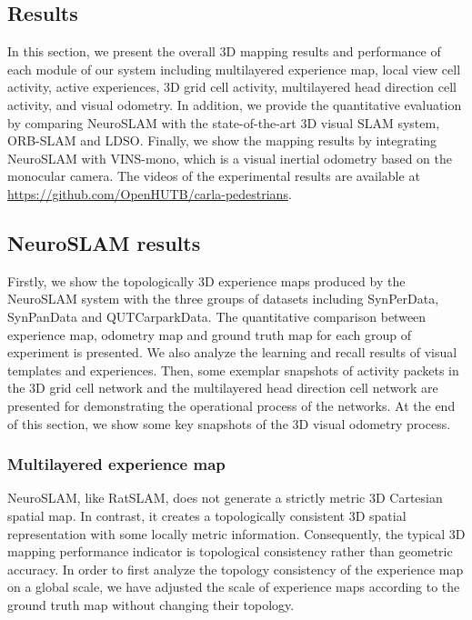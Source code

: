 \subsection{Results}

In this section, we present the overall 3D mapping results and performance of each module of our system including multilayered experience map, local view cell activity, active experiences, 3D grid cell activity, multilayered head direction cell activity, and visual odometry.
In addition, we provide the quantitative evaluation by comparing NeuroSLAM with the state-of-the-art 3D visual SLAM system, ORB-SLAM and LDSO.
Finally, we show the mapping results by integrating NeuroSLAM with VINS-mono, which is a visual inertial odometry based on the monocular camera.
The videos of the experimental results are available at \href{https://github.com/OpenHUTB/carla-pedestrians}{https://github.com/OpenHUTB/carla-pedestrians}.


\subsection{NeuroSLAM results}

Firstly, we show the topologically 3D experience maps produced by the NeuroSLAM system with the three groups of datasets including SynPerData, SynPanData and QUTCarparkData.
The quantitative comparison between experience map, odometry map and ground truth map for each group of experiment is presented.
We also analyze the learning and recall results of visual templates and experiences.
Then, some exemplar snapshots of activity packets in the 3D grid cell network and the multilayered head direction cell network are presented for demonstrating the operational process of the networks.
At the end of this section, we show some key snapshots of the 3D visual odometry process.


\subsubsection{Multilayered experience map}
NeuroSLAM, like RatSLAM, does not generate a strictly metric 3D Cartesian spatial map.
In contrast, it creates a topologically consistent 3D spatial representation with some locally metric information.
Consequently, the typical 3D mapping performance indicator is topological consistency rather than geometric accuracy.
In order to first analyze the topology consistency of the experience map on a global scale, we have adjusted the scale of experience maps according to the ground truth map without changing their topology.


